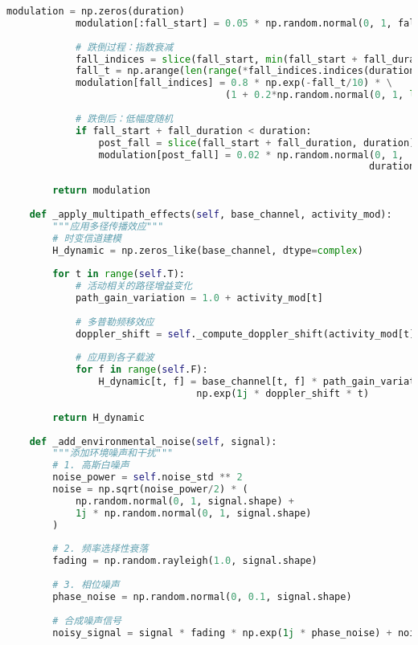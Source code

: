 \begin{lstlisting}[language=Python,caption=合成数据生成器核心实现]
            modulation = np.zeros(duration)
            modulation[:fall_start] = 0.05 * np.random.normal(0, 1, fall_start)
            
            # 跌倒过程：指数衰减
            fall_indices = slice(fall_start, min(fall_start + fall_duration, duration))
            fall_t = np.arange(len(range(*fall_indices.indices(duration))))
            modulation[fall_indices] = 0.8 * np.exp(-fall_t/10) * \
                                      (1 + 0.2*np.random.normal(0, 1, len(fall_t)))
            
            # 跌倒后：低幅度随机
            if fall_start + fall_duration < duration:
                post_fall = slice(fall_start + fall_duration, duration)
                modulation[post_fall] = 0.02 * np.random.normal(0, 1, 
                                                               duration - fall_start - fall_duration)
        
        return modulation
    
    def _apply_multipath_effects(self, base_channel, activity_mod):
        """应用多径传播效应"""
        # 时变信道建模
        H_dynamic = np.zeros_like(base_channel, dtype=complex)
        
        for t in range(self.T):
            # 活动相关的路径增益变化
            path_gain_variation = 1.0 + activity_mod[t]
            
            # 多普勒频移效应
            doppler_shift = self._compute_doppler_shift(activity_mod[t])
            
            # 应用到各子载波
            for f in range(self.F):
                H_dynamic[t, f] = base_channel[t, f] * path_gain_variation * \
                                 np.exp(1j * doppler_shift * t)
        
        return H_dynamic
    
    def _add_environmental_noise(self, signal):
        """添加环境噪声和干扰"""
        # 1. 高斯白噪声
        noise_power = self.noise_std ** 2
        noise = np.sqrt(noise_power/2) * (
            np.random.normal(0, 1, signal.shape) + 
            1j * np.random.normal(0, 1, signal.shape)
        )
        
        # 2. 频率选择性衰落
        fading = np.random.rayleigh(1.0, signal.shape)
        
        # 3. 相位噪声
        phase_noise = np.random.normal(0, 0.1, signal.shape)
        
        # 合成噪声信号
        noisy_signal = signal * fading * np.exp(1j * phase_noise) + noise
        

\end{lstlisting}
